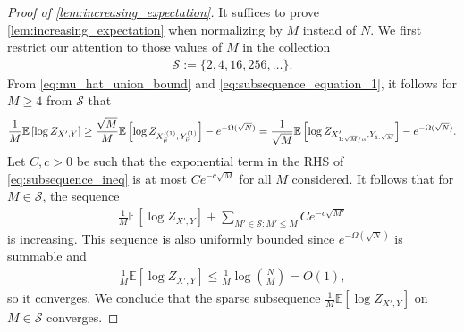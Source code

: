 \documentclass[11pt]{amsart}
\numberwithin{equation}{section}
\numberwithin{equation}{section}
\newcommand{\1}{\mathbbm{1}}
\newcommand{\E}{\mathbb{E}}
\theoremstyle{definition}
\begin{document}
\begin{proof}[Proof of \cref{lem:increasing_expectation}]
    It suffices to prove \cref{lem:increasing_expectation} when normalizing by $M$ instead of $N$. We first restrict our attention to those values of $M$ in the collection
    \begin{align*}
        \mathcal S := \{2, 4, 16, 256, \dots\}. 
    \end{align*}
    From \eqref{eq:mu_hat_union_bound} and \eqref{eq:subsequence_equation_1}, it follows for $M \geq 4$ from $\mathcal S$ that
    \begin{align} \label{eq:subsequence_ineq}
        \frac{1}{M}\E\left[\log Z_{X',Y}\right] \geq \frac{\sqrt{M}}{M}\E\left[\log Z_{X_{\Bar{\mu}}'^{(1)},\, Y_{\Bar{\nu}}^{(1)}}\right] - e^{-\Omega(\sqrt{N})} = \frac{1}{\sqrt{M}}\E\left[\log Z_{X'_{1:\sqrt{M}/\alpha}, Y_{1:\sqrt{M}}}\right] - e^{-\Omega(\sqrt{N})}.
    \end{align}
    Let $C, c > 0$ be such that the exponential term in the RHS of \eqref{eq:subsequence_ineq} is at most $Ce^{-c\sqrt{M}}$ for all $M$ considered. It follows that for $M \in \mathcal S$, the sequence
    \begin{align*}
        \frac{1}{M}\E\left[\log Z_{X',Y}\right] + \sum_{M' \in \mathcal S: M' \leq M} Ce^{-c\sqrt{M'}}
    \end{align*}
    is increasing. This sequence is also uniformly bounded since $e^{-\Omega(\sqrt{N})}$ is summable and
    \begin{align*}
        \frac{1}{M} \E\left[ \log Z_{X',Y} \right] \leq \frac{1}{M} \log \binom{N}{M} = O(1),
    \end{align*}
    so it converges. We conclude that the sparse subsequence $\frac{1}{M}\E[\log Z_{X',Y}]$ on $M \in \mathcal S$ converges.
    
    \smallskip
    

\end{proof}
\end{document}
